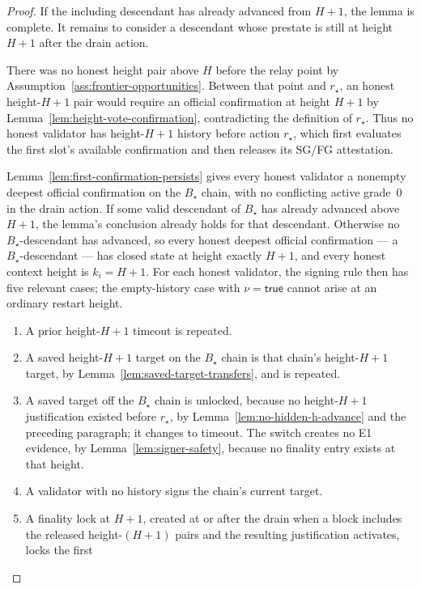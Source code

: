 \begin{proof}
If the including descendant has already advanced from \(H+1\), the lemma is
complete.  It remains to consider a descendant whose prestate is still at
height \(H+1\) after the drain action.

There was no honest height pair above
\(H\) before the relay point by
Assumption~\ref{ass:frontier-opportunities}.  Between that point and
\(r_\star\), an honest height-\(H+1\) pair would require an official
confirmation at height \(H+1\) by
Lemma~\ref{lem:height-vote-confirmation}, contradicting the definition of
\(r_\star\).  Thus no honest validator has height-\(H+1\) history before
action \(r_\star\), which first evaluates the first slot's available
confirmation and then releases its SG/FG attestation.

Lemma~\ref{lem:first-confirmation-persists} gives every honest validator a
nonempty deepest official confirmation on the \(B_\star\) chain, with no
conflicting active grade~0 in the drain action.  If some valid descendant
of \(B_\star\) has already advanced above \(H+1\), the lemma's
conclusion already holds for that descendant.  Otherwise no
\(B_\star\)-descendant has advanced, so every honest deepest official
confirmation --- a \(B_\star\)-descendant --- has closed state at
height exactly \(H+1\), and every honest context height is
\(k_i=H+1\).  For each honest validator, the signing rule then has
five relevant cases; the empty-history case with \(\nu=\mathsf{true}\)
cannot arise at an ordinary restart height.
\begin{enumerate}
 \item A prior height-\(H+1\) timeout is repeated.
 \item A saved height-\(H+1\) target on the \(B_\star\) chain is that chain's
   height-\(H+1\) target, by Lemma~\ref{lem:saved-target-transfers}, and is
   repeated.
 \item A saved target off the \(B_\star\) chain is unlocked, because no
   height-\(H+1\) justification existed before \(r_\star\), by
   Lemma~\ref{lem:no-hidden-h-advance} and the preceding paragraph; it changes
   to timeout.  The switch creates no E1 evidence, by
   Lemma~\ref{lem:signer-safety}, because no finality entry exists at that
   height.
 \item A validator with no history signs the chain's current target.
 \item A finality lock at \(H+1\), created at or after the drain when
   a block includes the released height-\((H{+}1)\) pairs and the
   resulting justification activates, locks the first

\end{enumerate}
\end{proof}
